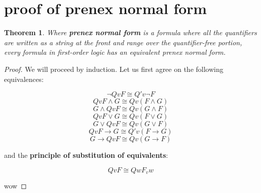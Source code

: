 \documentclass[a4paper,11pt]{article}
\newtheorem{thm}{Theorem}[section]
\begin{document}
\setcounter{equation}{0}

\pagebreak
	
	
\section{proof of prenex normal form}

\begin{thm} Where \textbf{prenex normal form} is a formula where all the quantifiers are written as a string at the front and range over the quantifier-free portion, every formula in first-order logic has an equivalent prenex normal form. \end{thm}

	
	\begin{proof}
		We will proceed by induction. Let us first agree on the following equivalences:
		
		\begin{equation} \lnot Qv F \cong Q'v \lnot F \end{equation}
		\begin{equation} Qv F \land G \cong Qv(F \land G) \end{equation}
		\begin{equation} G \land Qv F \cong Qv(G \land F) \end{equation}	
		\begin{equation} Qv F \lor G \cong Qv(F \lor G) \end{equation}
		\begin{equation} G \lor Qv F \cong Qv(G \lor F) \end{equation}
		\begin{equation} Qv F  \rightarrow G \cong Q'v(F \rightarrow G) \end{equation}
		\begin{equation} G \rightarrow Qv F \cong Qv(G \rightarrow F) \end{equation}
		
		\bigskip
		
		and the \textbf{principle of substitution of equivalents}:
		
		\begin{equation} Qv F \cong Qw F_{v} w \end{equation}
		
		\bigskip
		
		wow
		
	\end{proof}
	
\end{document}
